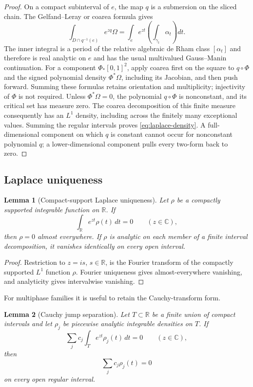 \documentclass[11pt]{article}
\numberwithin{equation}{section}
\newtheorem{lemma}[lemma]{Lemma}
\theoremstyle{definition}
\theoremstyle{remark}
\newcommand{\C}{\mathbb C}
\newcommand{\R}{\mathbb R}
\begin{document}
\begin{proof}
On a compact subinterval of $e$, the map $q$ is a submersion on the sliced
chain.  The Gelfand--Leray or coarea formula gives
\[
  \int_{D\cap q^{-1}(e)}e^{zq}\Omega
  =\int_e e^{zt}\left(\int_{\gamma_t}\alpha_t\right)dt.
\]
The inner integral is a period of the relative algebraic de Rham class
$[\alpha_t]$ and therefore is real analytic on $e$ and has the usual
multivalued Gauss--Manin continuation.  For a component $\Phi_*[0,1]^2$, apply coarea first on the square to
$q\circ\Phi$ and the signed polynomial density $\Phi^*\Omega$, including
its Jacobian, and then push forward. Summing these formulas retains
orientation and multiplicity; injectivity of $\Phi$ is not required.
Unless $\Phi^*\Omega=0$, the polynomial $q\circ\Phi$ is nonconstant,
and its critical set has measure zero. The coarea decomposition of this
finite measure consequently has an $L^1$ density, including across the
finitely many exceptional values.  Summing the regular intervals proves
\eqref{eq:laplace-density}.  A full-dimensional component on which $q$ is
constant cannot occur for nonconstant polynomial $q$; a lower-dimensional
component pulls every two-form back to zero.
\end{proof}

\subsection{Laplace uniqueness}

\begin{lemma}[Compact-support Laplace uniqueness]\label{lem:laplace-unique}
Let $\rho$ be a compactly supported integrable function on $\R$.  If
\[
  \int_{\R}e^{zt}\rho(t)\,dt=0
  \qquad(z\in\C),
\]
then $\rho=0$ almost everywhere.  If $\rho$ is analytic on each member of a
finite interval decomposition, it vanishes identically on every open
interval.
\end{lemma}

\begin{proof}
Restriction to $z=is$, $s\in\R$, is the Fourier transform of the compactly
supported $L^1$ function $\rho$.  Fourier uniqueness gives almost-everywhere
vanishing, and analyticity gives intervalwise vanishing.
\end{proof}

For multiphase families it is useful to retain the Cauchy-transform form.

\begin{lemma}[Cauchy jump separation]\label{lem:Cauchy-jump}
Let $T\subset\R$ be a finite union of compact intervals and let $\rho_j$ be
piecewise analytic integrable densities on $T$.  If
\[
  \sum_j c_j\int_T e^{zt}\rho_j(t)\,dt=0
  \qquad(z\in\C),
\]
then
\[
  \sum_j c_j\rho_j(t)=0
\]
on every open regular interval.
\end{lemma}
\end{document}
